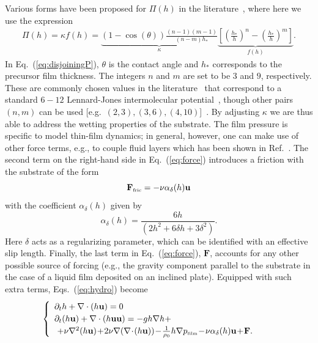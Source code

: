 Various forms have been proposed for $\Pi(h)$ in the literature~\cite{oronLongscaleEvolutionThin1997,thielePatternedDepositionMoving2014}, where here we use the expression
\begin{eqnarray}\label{eq:disjoiningP}
  \Pi(h) = \kappa f(h) = \underbrace{(1 - \cos(\theta))\frac{(n-1)(m-1)}{(n-m)h_*}}_{\kappa}\underbrace{\left[\left(\frac{h_*}{h}\right)^n -\left(\frac{h_*}{h}\right)^m\right]}_{f(h)}.
\end{eqnarray}
In Eq.~(\ref{eq:disjoiningP}), $\theta$ is the contact angle and $h_*$ corresponds to the precursor film thickness. 
The integers $n$ and $m$ are set to be $3$ and $9$, respectively. 
These are commonly chosen values in the literature~\cite{moultonEffectDisjoiningPressure2013,oronLongscaleEvolutionThin1997} that correspond to a standard $6-12$ Lennard-Jones intermolecular potential~\cite{fischerExistencePositiveSolutions2018}, though other pairs $(n,m)$ can be used [e.g.~$(2,3), (3,6), (4,10)$]~\cite{diezStabilityFinitelengthRivulet2009,wilczekSlidingDropsEnsemble2017, wedershovenInfraredLaserInduced2014}. 
By adjusting $\kappa$ we are thus able to address the wetting properties of the substrate. 
The film pressure is specific to model thin-film dynamics; in general, however, one can make use of other force terms, e.g., to couple fluid layers which has been shown in Ref.~\cite{roccaDevelopmentLatticeBoltzmann2012}. 
The second term on the right-hand side in Eq.~(\ref{eq:force}) introduces a friction with the substrate of the form
\begin{equation}\label{eq:forcefric}
  \mathbf{F}_{\mbox{\tiny{fric}}} = -\nu \alpha_{\delta}(h)\mathbf{u}
\end{equation}
with the coefficient $\alpha_{\delta}(h)$ given by
\begin{equation}\label{eq:alphafric}
  \alpha_{\delta}(h) = \frac{6h}{(2 h^2 + 6 \delta h + 3 \delta^2)}.
\end{equation}
Here $\delta$ acts as a regularizing parameter, which can be identified with an effective slip length. 
Finally, the last term in Eq.~(\ref{eq:force}), $\mathbf{F}$, accounts for any other possible source of forcing (e.g., the gravity component parallel to the substrate in the case of a liquid film deposited on an inclined plate).
Equipped with such extra terms, Eqs.~(\ref{eq:hydro}) become
\begin{equation}\label{eq:hydro2}
  \begin{cases}
    \begin{array}{ll}
      \partial_t h + \nabla \cdot (h \mathbf{u})  = 0 & \\ 
      \partial_t (h \mathbf{u}) + \nabla \cdot (h \mathbf{u}\mathbf{u}) = -gh \nabla h  +\\ 
      \,\, +  \nu \nabla^2 (h\mathbf{u}) \!+\! 2\nu \nabla (\nabla\! \cdot\! (h\mathbf{u}))
      \!-\!\frac{1}{\rho_0}h\nabla p_{\mbox{\tiny{film}}} \!-\! \nu \alpha_{\delta}(h) \mathbf{u}\!+\! \mathbf{F}. 
    \end{array}
  \end{cases}
\end{equation}
